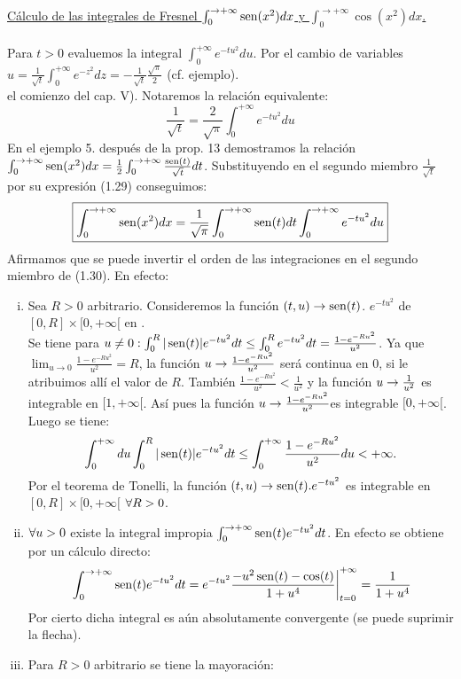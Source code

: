 \underline{Cálculo de las integrales de Fresnel $\int_0^{\to +\infty}\operatorname{sen} (x^2)dx$ y $\int_0^{\to +\infty}\cos (x^2)dx$.}\\ \\
Para $t>0$ evaluemos la integral $\int_0^{+\infty}e^{-t u^2}du$. Por el cambio de variables $u=\frac{1}{\sqrt{t}}\int_0^{+\infty}e^{-z^2}dz=-\frac{1}{\sqrt{t}}\frac{\sqrt{\pi}}{2}$  (cf. ejemplo). \\
el comienzo del cap. V). Notaremos la relación equivalente:\\

\begin{equation}
\frac{1}{\sqrt{t}}=\frac{2}{\sqrt{\pi}}\int_0^{+\infty}e^{-tu^2}du
\end{equation}
En el ejemplo 5. después de la prop. 13 demostramos la relación $\int_0^{\to +\infty}\operatorname{sen} (x^2)dx=\frac{1}{2}\int_0^{\to +\infty}\frac{\operatorname{sen} (t)}{\sqrt{t}}dt$. Substituyendo en el segundo miembro $\frac{1}{\sqrt{t}}$ por su expresión (1.29) conseguimos:
\begin{equation}
\boxed{\int_0^{\to +\infty}\operatorname{sen} (x^2)dx=\frac{1}{\sqrt{\pi}}\int_0^{\to +\infty}\operatorname{sen} (t)dt\int_0^{\to +\infty}e^{-tu^2}du}
\end{equation}
Afirmamos que se puede invertir el orden de las integraciones en el segundo miembro de (1.30). En efecto: 
\begin{enumerate}[i)]
\item Sea $R>0$ arbitrario. Consideremos la función $(t,u) \rightarrow \operatorname{sen} (t)$. $e^{-tu^2}$ de $[0,R]\times [0,+\infty[$ en \R .\\
Se tiene para $u\neq 0: \int_0^R| \operatorname{sen} (t)| e^{-t u^2}dt \leq 
 \int_0^Re^{-t u^2}dt=\frac{1-e^{-Ru^2}}{u^2}$. Ya que $\lim_{u \to 0}\frac{1-e^{-Ru^2}}{u^2}=R$, la función $u \rightarrow \frac{1-e^{-Ru^2}}{u^2}$ será continua en $0$, si le atribuimos allí el valor de $R$. También $\frac{1-e^{-Ru^2}}{u^2} < \frac{1}{u^2}$ y la función $u \rightarrow \frac{1}{u^2}$ es integrable en $[1,+\infty[$. Así pues la función $u \rightarrow \frac{1-e^{-Ru^2}}{u^2}$es integrable $[0,+\infty[$. Luego se tiene:\\
$$
\int_0^{+\infty}du\int_0^R | \operatorname{sen} (t) | e^{-tu^2}dt \leq \int_0^{+\infty}\frac{1-e^{-Ru^2}}{u^2}du < +\infty.
$$
Por el teorema de Tonelli, la función $(t,u) \to \operatorname{sen} (t). e^{-tu^2}$ es integrable en $[0,R] \times [0,+\infty[$ $\forall R>0$.
\item $\forall u>0$ existe la integral impropia $\int_0^{\to +\infty}\operatorname{sen} (t)e^{-tu^2}dt$. En efecto se obtiene por un cálculo directo: 
\begin{equation}
\left.
 \int_0^{\to +\infty}\operatorname{sen} (t)e^{-tu^2}dt=e^{-tu^2}\frac{-u^2 \operatorname{sen} (t)-\cos (t)}{1+u^4}\right|_{t=0}^{+\infty}=\frac{1}{1+u^4}
\end{equation}
Por cierto dicha integral es aún absolutamente convergente (se puede suprimir la flecha).
\item Para $R>0$ arbitrario se tiene la mayoración: 
\end{enumerate} 
